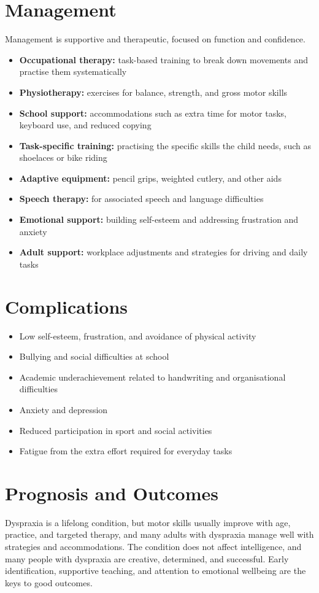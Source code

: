 \section*{Management}
Management is supportive and therapeutic, focused on function and confidence.
\begin{itemize}
    \item \textbf{Occupational therapy:} task-based training to break down movements and practise them systematically
    \item \textbf{Physiotherapy:} exercises for balance, strength, and gross motor skills
    \item \textbf{School support:} accommodations such as extra time for motor tasks, keyboard use, and reduced copying
    \item \textbf{Task-specific training:} practising the specific skills the child needs, such as shoelaces or bike riding
    \item \textbf{Adaptive equipment:} pencil grips, weighted cutlery, and other aids
    \item \textbf{Speech therapy:} for associated speech and language difficulties
    \item \textbf{Emotional support:} building self-esteem and addressing frustration and anxiety
    \item \textbf{Adult support:} workplace adjustments and strategies for driving and daily tasks
\end{itemize}

\section*{Complications}
\begin{itemize}
    \item Low self-esteem, frustration, and avoidance of physical activity
    \item Bullying and social difficulties at school
    \item Academic underachievement related to handwriting and organisational difficulties
    \item Anxiety and depression
    \item Reduced participation in sport and social activities
    \item Fatigue from the extra effort required for everyday tasks
\end{itemize}

\section*{Prognosis and Outcomes}
Dyspraxia is a lifelong condition, but motor skills usually improve with age, practice, and targeted therapy, and many adults with dyspraxia manage well with strategies and accommodations. The condition does not affect intelligence, and many people with dyspraxia are creative, determined, and successful. Early identification, supportive teaching, and attention to emotional wellbeing are the keys to good outcomes.

